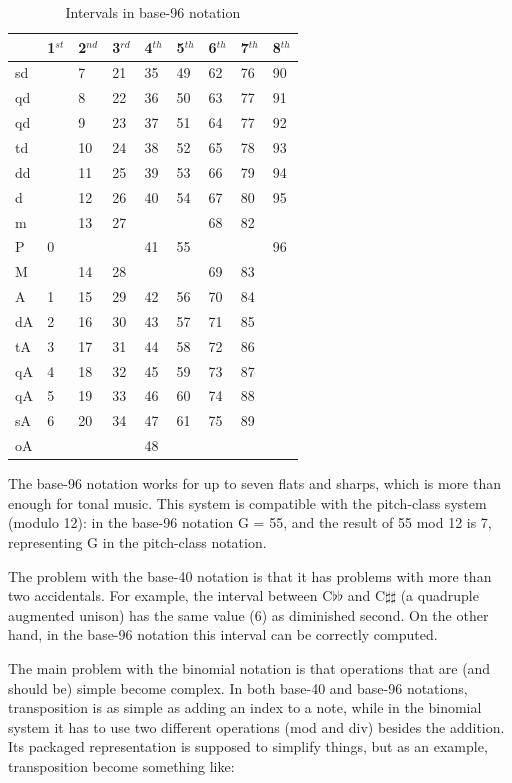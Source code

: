 \documentclass{article}
\begin{document}
\begin{table}
  \centering
  \begin{tabular}{l|llllllll}
    & 1$^{st}$& 2$^{nd}$& 3$^{rd}$& 4$^{th}$& 5$^{th}$& 6$^{th}$& 7$^{th}$& 8$^{th}$ \\
    \hline
    sd  &  & 7&21&35&49&62&76&90 \\
    qd  &  & 8&22&36&50&63&77&91 \\
    qd  &  & 9&23&37&51&64&77&92 \\
    td  &  &10&24&38&52&65&78&93 \\
    dd  &  &11&25&39&53&66&79&94 \\
    d   &  &12&26&40&54&67&80&95 \\
    m   &  &13&27&  &  &68&82&   \\
    P   & 0&  &  &41&55&  &  &96 \\
    M   &  &14&28&  &  &69&83&   \\
    A   & 1&15&29&42&56&70&84&   \\
    dA  & 2&16&30&43&57&71&85&   \\
    tA  & 3&17&31&44&58&72&86&   \\
    qA  & 4&18&32&45&59&73&87&   \\
    qA  & 5&19&33&46&60&74&88&   \\
    sA  & 6&20&34&47&61&75&89&   \\
    oA  &  &  &  &48&  &  &  &   
  \end{tabular}
  \caption{Intervals in base-96 notation}
  \label{tab:jama-intervalos}
\end{table}

The base-96 notation works for up to seven flats and sharps, which is
more than enough for tonal music. This system is compatible with the
pitch-class system (modulo 12): in the base-96 notation G = 55, and
the result of 55 mod 12 is 7, representing G in the pitch-class
notation. 

The problem with the base-40 notation is that it has problems with
more than two accidentals. For example, the interval between
C$\flat\flat$ and C$\sharp\sharp$ (a quadruple augmented unison) has
the same value (6) as diminished second. On the other hand, in the
base-96 notation this interval can be correctly computed.

The main problem with the binomial notation is that operations that
are (and should be) simple become complex. In both base-40 and base-96
notations, transposition is as simple as adding an index to a note, while
in the binomial system it has to use two different operations (mod and
div) besides the addition. Its packaged representation is supposed to
simplify things, but as an example, transposition become something
like:
\end{document}
